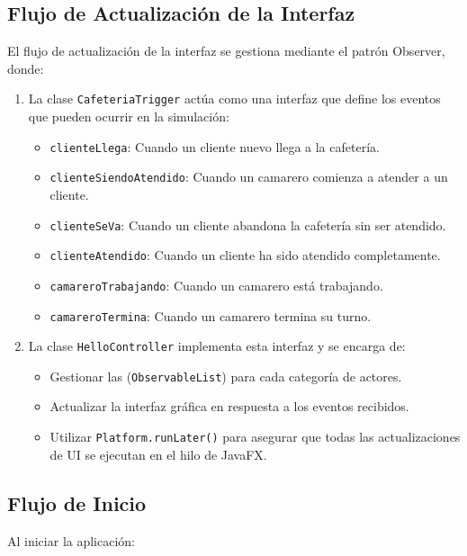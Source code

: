 \documentclass[a4paper,12pt]{article}
\begin{document}
\subsection{Flujo de Actualización de la Interfaz}

El flujo de actualización de la interfaz se gestiona mediante el patrón Observer, donde:

\begin{enumerate}
    \item La clase \texttt{CafeteriaTrigger} actúa como una interfaz que define los eventos que pueden ocurrir en la simulación:
    \begin{itemize}
        \item \texttt{clienteLlega}: Cuando un cliente nuevo llega a la cafetería.
        \item \texttt{clienteSiendoAtendido}: Cuando un camarero comienza a atender a un cliente.
        \item \texttt{clienteSeVa}: Cuando un cliente abandona la cafetería sin ser atendido.
        \item \texttt{clienteAtendido}: Cuando un cliente ha sido atendido completamente.
        \item \texttt{camareroTrabajando}: Cuando un camarero está trabajando.
        \item \texttt{camareroTermina}: Cuando un camarero termina su turno.
    \end{itemize}
    
    \item La clase \texttt{HelloController} implementa esta interfaz y se encarga de:
    \begin{itemize}
        \item Gestionar las (\texttt{ObservableList}) para cada categoría de actores.
        \item Actualizar la interfaz gráfica en respuesta a los eventos recibidos.
        \item Utilizar \texttt{Platform.runLater()} para asegurar que todas las actualizaciones de UI se ejecutan en el hilo de JavaFX.
    \end{itemize}
\end{enumerate}

\subsection{Flujo de Inicio}

Al iniciar la aplicación:
\end{document}

